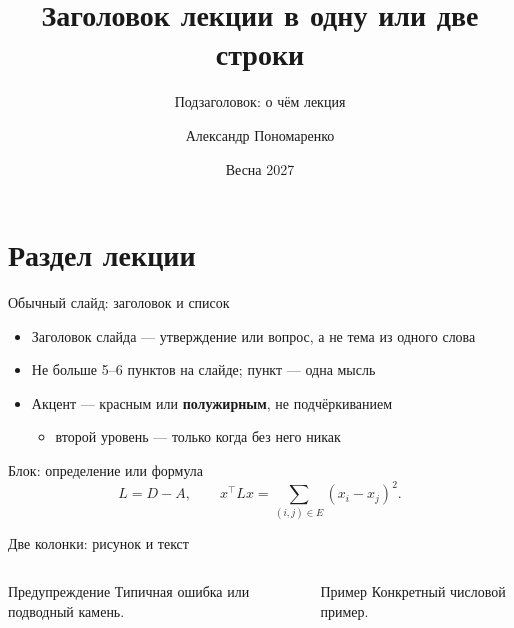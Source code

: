 \documentclass[aspectratio=169,10pt]{beamer}
\title{Заголовок лекции в одну или две строки}
\subtitle{Подзаголовок: о чём лекция}
\author{Александр Пономаренко}
\institute{НИУ ВШЭ -- Нижний Новгород, магистратура «Интеллектуальный анализ данных»}
\date{Весна 2027}
\begin{document}
\maketitle

\section{Раздел лекции}

\begin{frame}{Обычный слайд: заголовок и список}
\begin{itemize}
\item Заголовок слайда --- утверждение или вопрос, а не тема из одного слова
\item Не больше 5--6 пунктов на слайде; пункт --- одна мысль
\item Акцент --- \alert{красным} или \textbf{полужирным}, не подчёркиванием
  \begin{itemize}
  \item второй уровень --- только когда без него никак
  \end{itemize}
\end{itemize}
\begin{block}{Блок: определение или формула}
\[
  L = D - A,\qquad x^\top L x = \sum_{(i,j)\in E} (x_i - x_j)^2 .
\]
\end{block}
\end{frame}

\begin{frame}{Две колонки: рисунок и текст}
\begin{columns}[T]
\centering
{}
\begin{alertblock}{Предупреждение}
Типичная ошибка или подводный камень.
\end{alertblock}
\begin{exampleblock}{Пример}
Конкретный числовой пример.
\end{exampleblock}
\end{columns}
\end{frame}
\end{document}
